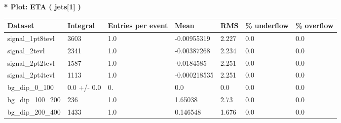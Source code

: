 \documentclass[a4paper, 10pt]{article}
\begin{document}
\textbf{* Plot: ETA ( jets[1] ) }\\
   \begin{table}[H]
  \begin{center}
    \begin{tabular}{|m{23.0mm}|m{23.0mm}|m{18.0mm}|m{19.0mm}|m{19.0mm}|m{19.0mm}|m{19.0mm}|}
      \hline
      {\cellcolor{yellow}         Dataset}& {\cellcolor{yellow}         Integral}& {\cellcolor{yellow}         Entries per event}& {\cellcolor{yellow}         Mean}& {\cellcolor{yellow}         RMS}& {\cellcolor{yellow}         \% underflow}& {\cellcolor{yellow}         \% overflow}\\
      \hline
      {\cellcolor{white}         signal\_1pt8tevl}& {\cellcolor{white}         3603}& {\cellcolor{white}         1.0}& {\cellcolor{white}         -0.00955319}& {\cellcolor{white}         2.227}& {\cellcolor{green}         0.0}& {\cellcolor{green}         0.0}\\
      \hline
      {\cellcolor{white}         signal\_2tevl}& {\cellcolor{white}         2341}& {\cellcolor{white}         1.0}& {\cellcolor{white}         -0.00387268}& {\cellcolor{white}         2.234}& {\cellcolor{green}         0.0}& {\cellcolor{green}         0.0}\\
      \hline
      {\cellcolor{white}         signal\_2pt2tevl}& {\cellcolor{white}         1587}& {\cellcolor{white}         1.0}& {\cellcolor{white}         -0.0184585}& {\cellcolor{white}         2.251}& {\cellcolor{green}         0.0}& {\cellcolor{green}         0.0}\\
      \hline
      {\cellcolor{white}         signal\_2pt4tevl}& {\cellcolor{white}         1113}& {\cellcolor{white}         1.0}& {\cellcolor{white}         -0.000218535}& {\cellcolor{white}         2.251}& {\cellcolor{green}         0.0}& {\cellcolor{green}         0.0}\\
      \hline
      {\cellcolor{white}         bg\_dip\_0\_100}& {\cellcolor{white}         0.0 +/\-- 0.0}& {\cellcolor{white}         0.}& {\cellcolor{white}         0.0}& {\cellcolor{white}         0.0}& {\cellcolor{green}         0.0}& {\cellcolor{green}         0.0}\\
      \hline
      {\cellcolor{white}         bg\_dip\_100\_200}& {\cellcolor{white}         236}& {\cellcolor{white}         1.0}& {\cellcolor{white}         1.65038}& {\cellcolor{white}         2.73}& {\cellcolor{green}         0.0}& {\cellcolor{green}         0.0}\\
      \hline
      {\cellcolor{white}         bg\_dip\_200\_400}& {\cellcolor{white}         1433}& {\cellcolor{white}         1.0}& {\cellcolor{white}         0.146548}& {\cellcolor{white}         1.676}& {\cellcolor{green}         0.0}& {\cellcolor{green}         0.0}\\

\end{tabular}
\end{center}
\end{table}
\end{document}

